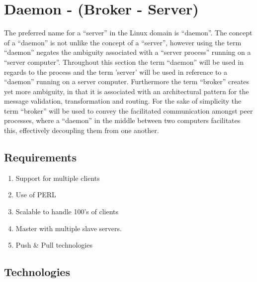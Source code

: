 \vspace{-2mm}
\section{Daemon - (Broker - Server)} 

	\normalsize
	{
		The preferred name for a ``server'' in the Linux domain is ``daemon''.  The concept of a ``daemon'' is not unlike the concept of a ``server'',
		however using the term ``daemon'' negates the ambiguity associated with a ``server process'' running on a ``server computer''.  
		Throughout this section the term ``daemon'' will be used in regards to the process and the term 'server' will be used in reference to a 
		``daemon'' running on a server computer.  
		\newline
		\newline
		Furthermore the term ``broker'' creates yet more ambiguity, in that it is associated with an architectural pattern for the message validation, 
		transformation and routing.  For the sake of simplicity the term ``broker'' will be used to convey the facilitated communication 
		amongst peer processes, where a ``daemon'' in the middle between two computers facilitates this, effectively decoupling them from one another.
	}

	\vspace{3mm}
	\subsection{Requirements}
	
		\vspace{-5mm}
		\begin{multicols}{2}
		
			\begin{enumerate}[itemsep=1pt,parsep=1pt]
				\item 	Support for multiple clients			 
				\item 	Use of PERL  
				\item 	Scalable to handle 100's of clients
			\columnbreak
				\item   Master with multiple slave servers. 			
				\item   Push \& Pull technologies
			\end{enumerate}
			
		\end{multicols}
		
	\subsection{Technologies}
	
